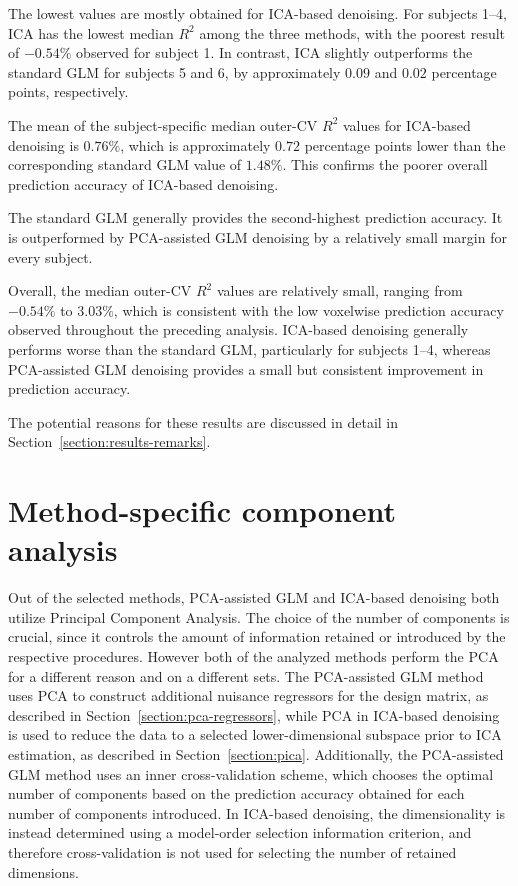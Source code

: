 \documentclass[english]{pwr_wmat_praca_dyplomowa}
\theoremstyle{definition}
\theoremstyle{remark}
\begin{document}
The lowest values are mostly obtained for ICA-based denoising. For subjects 1--4, ICA has the lowest median $R^2$ among the three methods, with the poorest result of $-0.54\%$ observed for subject 1. In contrast, ICA slightly outperforms the standard GLM for subjects 5 and 6, by approximately $0.09$ and $0.02$ percentage points, respectively.

The mean of the subject-specific median outer-CV $R^2$ values for ICA-based denoising is $0.76\%$, which is approximately $0.72$ percentage points lower than the corresponding standard GLM value of $1.48\%$. This confirms the poorer overall prediction accuracy of ICA-based denoising.

The standard GLM generally provides the second-highest prediction accuracy. It is outperformed by PCA-assisted GLM denoising by a relatively small margin for every subject.

Overall, the median outer-CV $R^2$ values are relatively small, ranging from $-0.54\%$ to $3.03\%$, which is consistent with the low voxelwise prediction accuracy observed throughout the preceding analysis. ICA-based denoising generally performs worse than the standard GLM, particularly for subjects 1--4, whereas PCA-assisted GLM denoising provides a small but consistent improvement in prediction accuracy.

The potential reasons for these results are discussed in detail in Section~\ref{section:results-remarks}.

\newpage
\section{Method-specific component analysis}

Out of the selected methods, PCA-assisted GLM and ICA-based denoising both utilize Principal Component Analysis. The choice of the number of components is crucial, since it controls the amount of information retained or introduced by the respective procedures. However both of the analyzed methods perform the PCA for a different reason and on a different sets. The PCA-assisted GLM method uses PCA to construct additional nuisance regressors for the design matrix, as described in Section~\ref{section:pca-regressors}, while PCA in ICA-based denoising is used to reduce the data to a selected lower-dimensional subspace prior to ICA estimation, as described in Section~\ref{section:pica}. Additionally, the PCA-assisted GLM method uses an inner cross-validation scheme, which chooses the optimal number of components based on the prediction accuracy obtained for each number of components introduced. In ICA-based denoising, the dimensionality is instead determined using a model-order selection information criterion, and therefore cross-validation is not used for selecting the number of retained dimensions.
\end{document}

